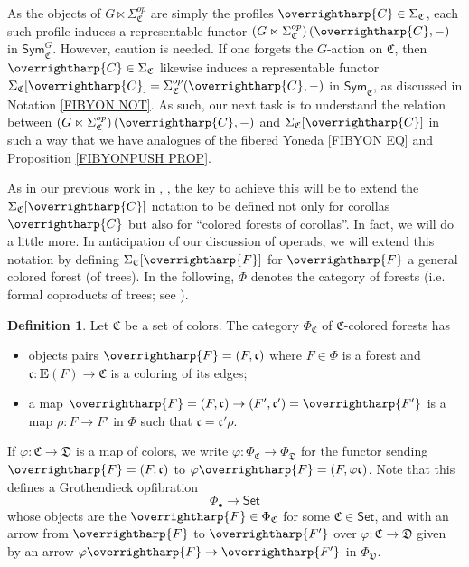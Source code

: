 \documentclass[a4paper,10pt
]{article}%
\numberwithin{equation}{section}
\numberwithin{figure}{section}
\theoremstyle{definition} %
\newtheorem{definition}[equation]{Definition}%
\newcommand{\vect}[1]{\text{\overrightharp{\ensuremath{#1}}}}
\newcommand{\1}{\ensuremath{\mathbbm 1}}%
\begin{document}
As the objects of 
$G \ltimes \Sigma^{op}_{\mathfrak{C}}$
are simply the profiles
$\vect{C} \in \Sigma_{\mathfrak{C}}$,
each such profile induces a representable functor
$\left(G \ltimes \Sigma^{op}_{\mathfrak{C}}\right)(\vect{C},-)$
in 
$\mathsf{Sym}^G_{\mathfrak{C}}$.
However, caution is needed.
If one forgets the $G$-action on $\mathfrak{C}$,
then $\vect{C} \in \Sigma_{\mathfrak{C}}$
likewise induces a representable functor 
$\Sigma_{\mathfrak{C}}[\vect{C}]=\Sigma^{op}_{\mathfrak{C}}(\vect{C},-)$
in $\mathsf{Sym}_{\mathfrak{C}}$,
as discussed in Notation \ref{FIBYON NOT}.
%
As such, our next task is to understand the relation between 
$\left(G \ltimes \Sigma^{op}_{\mathfrak{C}}\right)(\vect{C},-)$
and 
$\Sigma_{\mathfrak{C}}[\vect{C}]$
in such a way that we have analogues of the 
fibered Yoneda \eqref{FIBYON EQ}
and Proposition \ref{FIBYONPUSH PROP}.


As in our previous work in 
\cite[Not. 5.56]{Per18}, \cite[\S 2.3]{BP20},
the key to achieve this will be to extend the
$\Sigma_{\mathfrak{C}}[\vect{C}]$
notation to be defined not only for corollas $\vect{C}$
but also for ``colored forests of corollas''.
In fact, we will do a little more. 
In anticipation of our discussion of operads, 
we will extend this notation by defining 
$\Sigma_{\mathfrak{C}}[\vect{F}]$
for $\vect{F}$ a general colored forest (of trees).
In the following, $\Phi$ denotes the category of forests
(i.e. formal coproducts of trees; see \cite[\S 5.1]{Per18}).

\begin{definition}\label{COLFOR DEF}
	Let $\mathfrak{C}$ be a set of colors.
	The category $\Phi_{\mathfrak{C}}$ of $\mathfrak{C}$-colored forests has
	\begin{itemize}
		\item objects pairs
		$\vect{F} = (F,\mathfrak{c})$
		where 
		$F\in \Phi$ is a forest
		and 
		$\mathfrak{c}\colon \boldsymbol{E}(F) \to \mathfrak{C}$ 
		is a coloring of its edges;
		\item a map
		$\vect{F}=(F,\mathfrak{c}) \to 
		(F',\mathfrak{c}') = \vect{F'}$
		is a map $\rho \colon F \to F'$ in $\Phi$
		such that
		$\mathfrak{c} = \mathfrak{c}' \rho$.
	\end{itemize}
	If $\varphi\colon \mathfrak{C} \to \mathfrak{D}$ is a map of colors,
	we write
	$\varphi \colon \Phi_{\mathfrak{C}} \to \Phi_{\mathfrak{D}}$
	for the functor sending 
	$\vect{F} = (F,\mathfrak{c})$
	to 
	$\varphi\vect{F} = (F,\varphi\mathfrak{c})$.
	Note that this defines a Grothendieck opfibration
	\begin{equation}\label{PHIBGRO EQ}
	\Phi_{\bullet} \to \mathsf{Set}
	\end{equation}
	whose objects are the $\vect{F} \in \Phi_{\mathfrak{C}}$ for some
	$\mathfrak{C} \in \mathsf{Set}$,
	and with an arrow
	from $\vect{F}$ to $\vect{F'}$
	over
	$\varphi \colon \mathfrak{C} \to \mathfrak{D}$
	given by an arrow
	$\varphi \vect{F} \to \vect{F'}$ in $\Phi_{\mathfrak{D}}$.
\end{definition}
\end{document}
